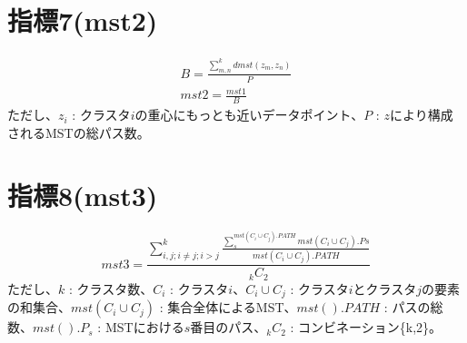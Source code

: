 \documentclass{article}
\begin{document}
\section{指標7(mst2)}
\begin{eqnarray}
B = { \frac{\sum_{m,n}^{k}{dmst(z_m,z_n)}}{P} } \\
mst2 = { \frac{mst1}{B} }
\end{eqnarray}
ただし、$z_i$ : クラスタ$i$の重心にもっとも近いデータポイント、$P$ : $z$により構成されるMSTの総パス数。

\section{指標8(mst3)}
\begin{equation}
mst3 = { \frac{ \sum_{i,j;i\neq{}j;i>j}^{k}{ \frac{ \sum_{s}^{mst(C_i\cup{}C_j).PATH}{ mst(C_i\cup{}C_j).Ps } }{mst(C_i\cup{}C_j).PATH} } }{ {}_{k}C_2 } }
\end{equation}
ただし、$k$ : クラスタ数、$C_i$ : クラスタ$i$、$C_i\cup{}C_j$ : クラスタ$i$とクラスタ$j$の要素の和集合、$mst(C_i\cup{}C_j)$ : 集合全体によるMST、$mst().PATH$ : パスの総数、$mst().P_s$ : MSTにおける$s$番目のパス、${}_{k}C_2$ : コンビネーション\{k,2\}。
\end{document}
